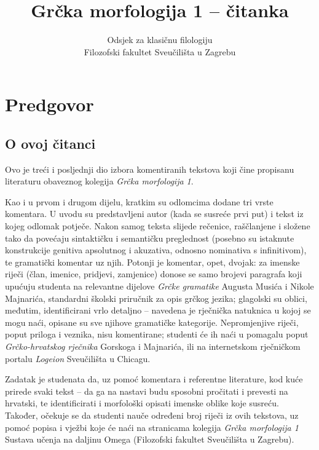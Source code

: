 \documentclass[a4paper,12pt,twoside]{report}
\newcommand{\subtitle}[1]{%
  \posttitle{%
    \par\end{center}
    \begin{center}\large#1\end{center}
    \vskip0.5em}%
}
\begin{document}
\title{Grčka morfologija 1 – čitanka}
\subtitle{Vježbe 41–60}
\author{Odsjek za klasičnu filologiju\\
Filozofski fakultet Sveučilišta u Zagrebu}
\maketitle

\clearpage
\thispagestyle{empty}




\chapter*{Predgovor}

\section*{O ovoj čitanci}

Ovo je treći i posljednji dio izbora komentiranih tekstova koji čine propisanu literaturu obaveznog kolegija \textit{Grčka morfologija 1}.

Kao i u prvom i drugom dijelu, kratkim su odlomcima dodane tri vrste komentara. U uvodu su predstavljeni autor (kada se susreće prvi put) i tekst iz kojeg odlomak potječe. Nakon samog teksta slijede rečenice, raščlanjene i složene tako da povećaju sintaktičku i semantičku preglednost (posebno su istaknute konstrukcije genitiva apsolutnog i akuzativa, odnosno nominativa s infinitivom), te gramatički komentar uz njih. Potonji je komentar, opet, dvojak: za imenske riječi (član, imenice, pridjevi, zamjenice) donose se samo brojevi paragrafa koji upućuju studenta na relevantne dijelove \textit{Grčke gramatike} Augusta Musića i Nikole Majnarića, standardni školski priručnik za opis grčkog jezika; glagolski su oblici, međutim, identificirani vrlo detaljno – navedena je rječnička natuknica u kojoj se mogu naći, opisane su sve njihove gramatičke kategorije. Nepromjenjive riječi, poput priloga i veznika, nisu komentirane; studenti će ih naći u pomagalu poput \textit{Grčko-hrvatskog rječnika} Gorskoga i Majnarića, ili na internetskom rječničkom portalu \textit{Logeion} Sveučilišta u Chicagu.

Zadatak je studenata da, uz pomoć komentara i referentne literature, kod kuće prirede svaki tekst – da ga na nastavi budu sposobni pročitati i prevesti na hrvatski, te identificirati i morfološki opisati imenske oblike koje susreću. Također, očekuje se da studenti nauče određeni broj riječi iz ovih tekstova, uz pomoć popisa i vježbi koje će naći na stranicama kolegija \textit{Grčka morfologija 1} Sustava učenja na daljinu Omega (Filozofski fakultet Sveučilišta u Zagrebu).
\end{document}
